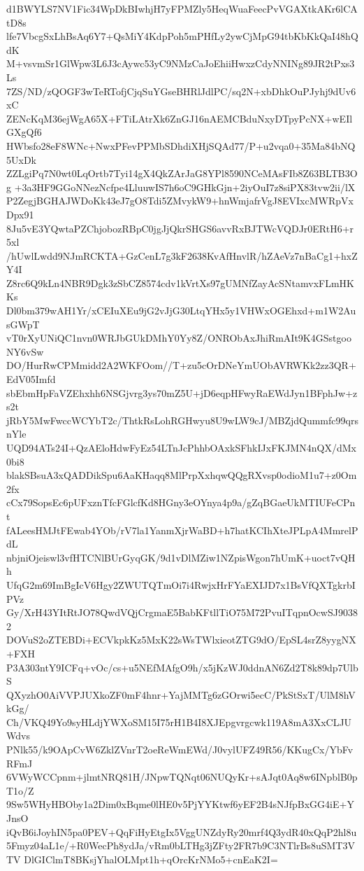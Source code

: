 d1BWYLS7NV1Fic34WpDkBIwhjH7yFPMZly5HeqWuaFeecPvVGAXtkAKr6lCAtD8s
lfe7VbcgSxLhBsAq6Y7+QsMiY4KdpPoh5mPHfLy2ywCjMpG94tbKbKkQaI48hQdK
M+vsvmSr1GlWpw3L6J3cAywc53yC9NMzCaJoEhiiHwxzCdyNNINg89JR2tPxs3Ls
7ZS/ND/zQOGF3wTeRTofjCjqSuYGseBHRlJdlPC/sq2N+xbDhkOuPJyhj9dUv6xC
ZENcKqM36ejWgA65X+FTiLAtrXk6ZnGJ16nAEMCBduNxyDTpyPcNX+wEIlGXgQf6
HWbsfo28eF8WNc+NwxPFevPPMbSDhdiXHjSQAd77/P+u2vqa0+35Ma84bNQ5UxDk
ZZLgiPq7N0wt0LqOrtb7Tyi14gX4QkZArJaG8YPl8590NCeMAsFIb8Z63BLTB3Og
+3a3HF9GGoNNezNcfpe4LluuwIS7h6oC9GHkGjn+2iyOuI7z8siPX83tvw2ii/lX
P2ZegjBGHAJWDoKk43eJ7gO8Tdi5ZMvykW9+hnWmjafrVgJ8EVIxcMWRpVxDpx91
8Ju5vE3YQwtaPZChjobozRBpC0jgJjQkrSHGS6avvRxBJTWcVQDJr0ERtH6+r5xl
/hUwlLwdd9NJmRCKTA+GzCenL7g3kF2638KvAfHnvlR/hZAeVz7nBaCg1+hxZY4I
Z8rc6Q9kLn4NBR9Dgk3zSbCZ8574cdv1kVrtXs97gUMNfZayAcSNtamvxFLmHKKs
Dl0bm379wAH1Yr/xCEIuXEu9jG2vJjG30LtqYHx5y1VHWxOGEhxd+m1W2AusGWpT
vT0rXyUNiQC1nvn0WRJbGUkDMhY0Yy8Z/ONRObAxJhiRmAIt9K4GSstgooNY6vSw
DO/HurRwCPMmidd2A2WKFOom//T+zu5cOrDNeYmUObAVRWKk2zz3QR+EdV05Imfd
sbEbmHpFaVZEhxhh6NSGjvrg3ys70mZ5U+jD6eqpHFwyRaEWdJyn1BFphJw+zs2t
jRbY5MwFwccWCYbT2c/ThtkRsLohRGHwyu8U9wLW9cJ/MBZjdQummfc99qrsnYle
UQD94ATs24I+QzAEloHdwFyEz54LTnJcPhhbOAxkSFhkIJxFKJMN4nQX/dMx0bi8
blakSBsuA3xQADDikSpu6AaKHaqq8MlPrpXxhqwQQgRXvsp0odioM1u7+z0Om2fx
cCx79SopsEc6pUFxznTfcFGlcfKd8HGny3eOYnya4p9a/gZqBGaeUkMTIUFeCPnt
fALeesHMJtFEwab4YOb/rV7la1YanmXjrWaBD+h7hatKCIhXteJPLpA4MmrelPdL
nbjniOjeiswl3vfHTCNlBUrGyqGK/9d1vDlMZiw1NZpisWgon7hUmK+uoct7vQHh
UfqG2m69ImBgIcV6Hgy2ZWUTQTmOi7i4RwjxHrFYaEXIJD7x1BsVfQXTgkrbIPVz
Gy/XrH43YItRtJO78QwdVQjCrgmaE5BabKFtllTiO75M72PvuITqpnOcwSJ90382
DOVuS2oZTEBDi+ECVkpkKz5MxK22sWsTWlxieotZTG9dO/EpSL4srZ8yygNX+FXH
P3A303ntY9ICFq+vOc/cs+u5NEfMAfgO9h/x5jKzWJ0ddnAN6Zd2T8k89dp7UlbS
QXyzhO0AiVVPJUXkoZF0mF4hnr+YajMMTg6zGOrwi5ecC/PkStSxT/UlM8hVkGg/
Ch/VKQ49Yo9syHLdjYWXoSM15I75rH1B4I8XJEpgvrgcwk119A8mA3XxCLJUWdvs
PNlk55/k9OApCvW6ZklZVnrT2oeReWmEWd/J0vylUFZ49R56/KKugCx/YbFvRFmJ
6VWyWCCpnm+jlmtNRQ81H/JNpwTQNqt06NUQyKr+sAJqt0Aq8w6INpblB0pT1o/Z
9Sw5WHyHBOby1a2Dim0xBqme0lHE0v5PjYYKtwf6yEF2B4sNJfpBxGG4iE+YJnsO
iQvB6iJoyhIN5pa0PEV+QqFiHyEtgIx5VggUNZdyRy20mrf4Q3ydR40xQqP2hl8u
5Fmyz04aL1e/+R0WecPh8ydJa/vRm0bLTHg3jZFty2FR7b9C3NTlrBs8uSMT3VTV
DlGIClmT8BKsjYhalOLMpt1h+qOrcKrNMo5+cnEaK2I=
